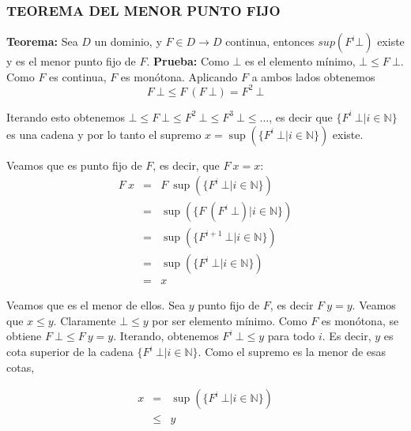   \subsubsection*{TEOREMA DEL MENOR PUNTO FIJO}
    \PN \textbf{Teorema:} Sea $D$ un dominio, y $F \in D \rightarrow D$ continua, entonces $sup(F^i \bot)$ existe y es el menor punto fijo de $F$.
    \PN \textbf{Prueba:} Como $\bot$ es el elemento mínimo, $\bot \leq F\ \bot$. Como $F$ es continua, $F$ es monótona. Aplicando $F$ a ambos lados obtenemos
    \[ F\ \bot \leq F\ (F\ \bot) = F^2\ \bot\]
    
    \PN Iterando esto obtenemos $\bot \leq F\ \bot \leq F^2\ \bot \leq F^3\ \bot \leq \ldots$, es decir que $\{F^i\ \bot|i \in \mathbb N\}$ es una cadena y por lo tanto el supremo $x = \sup(\{F^i\ \bot|i \in \mathbb N\})$ existe.
    
    \PN Veamos que es punto fijo de $F$, es decir, que $F\ x = x$:
    \[
      \begin{array}{rcl}
        F\ x &=& F\ \sup(\{F^i\ \bot|i \in \mathbb N\}) \\
               &=& \sup(\{F\ (F^i\ \bot)|i \in \mathbb N\}) \\
               &=& \sup(\{F^{i+1}\ \bot|i \in \mathbb N\}) \\
               &=& \sup(\{F^i\ \bot|i \in \mathbb N\}) \\
               &=& x
      \end{array}
    \]
    
    \PN Veamos que es el menor de ellos. Sea $y$ punto fijo de $F$, es decir $F\ y = y$. Veamos que $x \leq y$. Claramente $\bot \leq y$ por ser elemento mínimo. Como $F$ es monótona, se obtiene $F\ \bot \leq F\ y = y$. Iterando, obtenemos $F^i\ \bot \leq y$ para todo $i$. Es decir, $y$ es cota superior de la cadena $\{F^i\ \bot|i \in \mathbb N\}$. Como el supremo es la menor de esas cotas,

    \[
      \begin{array}{rcl}
        x &=& \sup(\{F^i\ \bot|i \in \mathbb N\}) \\
               & \leq & y
      \end{array}
    \]